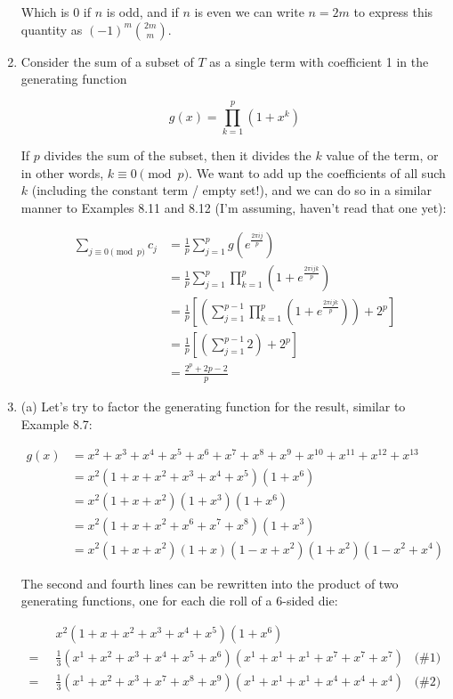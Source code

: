 \documentclass{book}
\numberwithin{equation}{section}
\begin{document}
\begin{enumerate}[label={8.\arabic*}]
Which is 0 if $n$ is odd, and if $n$ is even we can write $n = 2m$ to express this quantity as $(-1)^m {2m \choose m}$.

\item
Consider the sum of a subset of $T$ as a single term with coefficient 1 in the generating function

$$ g(x) = \prod_{k=1}^p (1 + x^k) $$

If $p$ divides the sum of the subset, then it divides the $k$ value of the term, or in other words, $k \equiv 0 \pmod{p}$.
We want to add up the coefficients of all such $k$ (including the constant term / empty set!), and we can do so in a
similar manner to Examples 8.11 and 8.12 (I'm assuming, haven't read that one yet):

\begin{align*}
\sum_{j \equiv 0 \pmod{p}} c_j & = \frac{1}{p}\sum_{j=1}^p g(e^{\frac{2\pi i j}{p}}) \\
& = \frac{1}{p}\sum_{j=1}^p\prod_{k=1}^p (1+e^{\frac{2\pi i jk}{p}}) \\
& = \frac{1}{p}\left[\left(\sum_{j=1}^{p-1}\prod_{k=1}^p (1+e^{\frac{2\pi i jk}{p}})\right) + 2^p\right] \\
& = \frac{1}{p}\left[\left(\sum_{j=1}^{p-1} 2\right) + 2^p\right] \\
& = \frac{2^p + 2p - 2}{p}
\end{align*}

\item
(a) Let's try to factor the generating function for the result, similar to Example 8.7:

\begin{align*}
g(x) & = x^2 + x^3 + x^4 + x^5 + x^6 + x^7 + x^8 + x^9 + x^{10} + x^{11} + x^{12} + x^{13} \\
& = x^2(1 + x + x^2 + x^3 + x^4 + x^5)(1 + x^6) \\
& = x^2(1+ x + x^2)(1 + x^3)(1 + x^6) \\
& = x^2(1 + x + x^2 + x^6 + x^7 + x^8)(1 + x^3) \\
& = x^2(1+x + x^2)(1 + x)(1 - x + x^2)(1 + x^2)(1 - x^2 + x^4)
\end{align*}

The second and fourth lines can be rewritten into the product of two generating functions, one for each die roll
of a 6-sided die:

\begin{align*}
& x^2(1 + x + x^2 + x^3 + x^4 + x^5)(1 + x^6) \\
= \;\; & \frac{1}{3}(x^1 + x^2 + x^3 + x^4 + x^5 + x^6)(x^1 + x^1 + x^1 + x^7 + x^7 + x^7)\;\;\;\text{(\#1)} \\
= \;\; & \frac{1}{3}(x^1 + x^2 + x^3 + x^7 + x^8 + x^9)(x^1 + x^1 + x^1 + x^4 + x^4 + x^4)\;\;\;\text{(\#2)}
\end{align*}


\end{enumerate}
\end{document}
